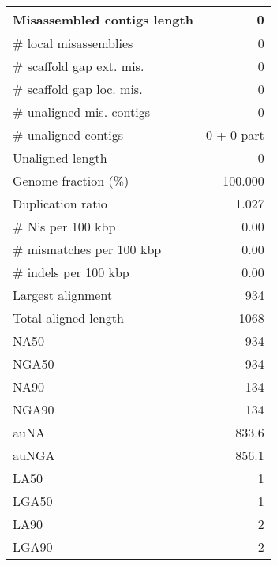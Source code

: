 \documentclass[12pt,a4paper]{article}
\begin{document}
\begin{table}[ht]
\begin{center}
\begin{tabular}{|l*{1}{|r}|}
Misassembled contigs length & 0 \\ \hline
\# local misassemblies & 0 \\ \hline
\# scaffold gap ext. mis. & 0 \\ \hline
\# scaffold gap loc. mis. & 0 \\ \hline
\# unaligned mis. contigs & 0 \\ \hline
\# unaligned contigs & 0 + 0 part \\ \hline
Unaligned length & 0 \\ \hline
Genome fraction (\%) & 100.000 \\ \hline
Duplication ratio & 1.027 \\ \hline
\# N's per 100 kbp & 0.00 \\ \hline
\# mismatches per 100 kbp & 0.00 \\ \hline
\# indels per 100 kbp & 0.00 \\ \hline
Largest alignment & 934 \\ \hline
Total aligned length & 1068 \\ \hline
NA50 & 934 \\ \hline
NGA50 & 934 \\ \hline
NA90 & 134 \\ \hline
NGA90 & 134 \\ \hline
auNA & 833.6 \\ \hline
auNGA & 856.1 \\ \hline
LA50 & 1 \\ \hline
LGA50 & 1 \\ \hline
LA90 & 2 \\ \hline
LGA90 & 2 \\ \hline
\end{tabular}
\end{center}
\end{table}
\end{document}
